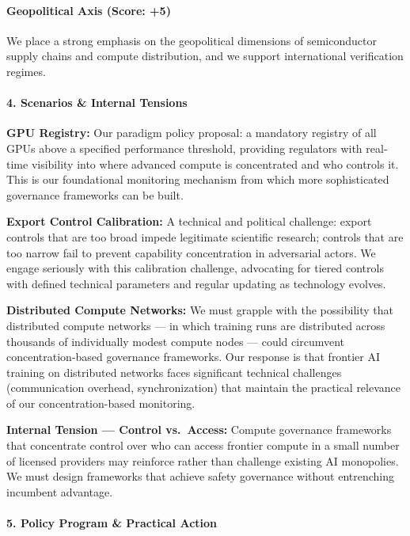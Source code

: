 \paragraph{Geopolitical Axis (Score:
+5)}\label{geopolitical-axis-score-5}

We place a strong emphasis on the geopolitical dimensions of
semiconductor supply chains and compute distribution, and we support
international verification regimes.

\paragraph{4. Scenarios \& Internal
Tensions}\label{scenarios-internal-tensions-8}

\textbf{GPU Registry:} Our paradigm policy proposal: a mandatory
registry of all GPUs above a specified performance threshold, providing
regulators with real-time visibility into where advanced compute is
concentrated and who controls it. This is our foundational monitoring
mechanism from which more sophisticated governance frameworks can be
built.

\textbf{Export Control Calibration:} A technical and political
challenge: export controls that are too broad impede legitimate
scientific research; controls that are too narrow fail to prevent
capability concentration in adversarial actors. We engage seriously with
this calibration challenge, advocating for tiered controls with defined
technical parameters and regular updating as technology evolves.

\textbf{Distributed Compute Networks:} We must grapple with the
possibility that distributed compute networks --- in which training runs
are distributed across thousands of individually modest compute nodes
--- could circumvent concentration-based governance frameworks. Our
response is that frontier AI training on distributed networks faces
significant technical challenges (communication overhead,
synchronization) that maintain the practical relevance of our
concentration-based monitoring.

\textbf{Internal Tension --- Control vs.~Access:} Compute governance
frameworks that concentrate control over who can access frontier compute
in a small number of licensed providers may reinforce rather than
challenge existing AI monopolies. We must design frameworks that achieve
safety governance without entrenching incumbent advantage.

\paragraph{5. Policy Program \& Practical
Action}\label{policy-program-practical-action-8}


